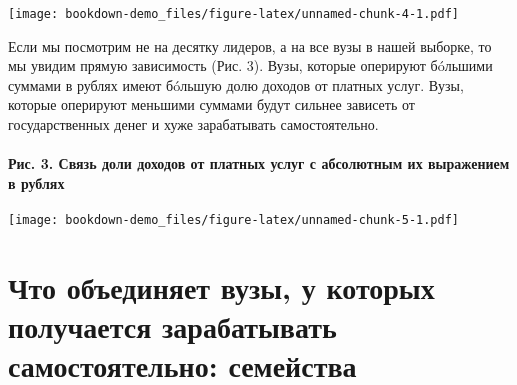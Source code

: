 \documentclass[]{book}
\let\oldparagraph\paragraph
\renewcommand{\paragraph}[1]{\oldparagraph{#1}\mbox{}}
\begin{document}
\texttt{[image: bookdown-demo\_files/figure-latex/unnamed-chunk-4-1.pdf]}

Если мы посмотрим не на десятку лидеров, а на все вузы в нашей выборке, то мы увидим прямую зависимость (Рис. 3). Вузы, которые оперируют бóльшими суммами в рублях имеют бóльшую долю доходов от платных услуг. Вузы, которые оперируют меньшими суммами будут сильнее зависеть от государственных денег и хуже зарабатывать самостоятельно.

\hypertarget{ux440ux438ux441.-3.-ux441ux432ux44fux437ux44c-ux434ux43eux43bux438-ux434ux43eux445ux43eux434ux43eux432-ux43eux442-ux43fux43bux430ux442ux43dux44bux445-ux443ux441ux43bux443ux433-ux441-ux430ux431ux441ux43eux43bux44eux442ux43dux44bux43c-ux438ux445-ux432ux44bux440ux430ux436ux435ux43dux438ux435ux43c-ux432-ux440ux443ux431ux43bux44fux445}{%
\paragraph{Рис. 3. Связь доли доходов от платных услуг с абсолютным их выражением в рублях}\label{ux440ux438ux441.-3.-ux441ux432ux44fux437ux44c-ux434ux43eux43bux438-ux434ux43eux445ux43eux434ux43eux432-ux43eux442-ux43fux43bux430ux442ux43dux44bux445-ux443ux441ux43bux443ux433-ux441-ux430ux431ux441ux43eux43bux44eux442ux43dux44bux43c-ux438ux445-ux432ux44bux440ux430ux436ux435ux43dux438ux435ux43c-ux432-ux440ux443ux431ux43bux44fux445}}

\texttt{[image: bookdown-demo\_files/figure-latex/unnamed-chunk-5-1.pdf]}

\hypertarget{ux447ux442ux43e-ux43eux431ux44aux435ux434ux438ux43dux44fux435ux442-ux432ux443ux437ux44b-ux443-ux43aux43eux442ux43eux440ux44bux445-ux43fux43eux43bux443ux447ux430ux435ux442ux441ux44f-ux437ux430ux440ux430ux431ux430ux442ux44bux432ux430ux442ux44c-ux441ux430ux43cux43eux441ux442ux43eux44fux442ux435ux43bux44cux43dux43e-ux441ux435ux43cux435ux439ux441ux442ux432ux430}{%
\section{Что объединяет вузы, у которых получается зарабатывать самостоятельно: семейства}\label{ux447ux442ux43e-ux43eux431ux44aux435ux434ux438ux43dux44fux435ux442-ux432ux443ux437ux44b-ux443-ux43aux43eux442ux43eux440ux44bux445-ux43fux43eux43bux443ux447ux430ux435ux442ux441ux44f-ux437ux430ux440ux430ux431ux430ux442ux44bux432ux430ux442ux44c-ux441ux430ux43cux43eux441ux442ux43eux44fux442ux435ux43bux44cux43dux43e-ux441ux435ux43cux435ux439ux441ux442ux432ux430}}
\end{document}
